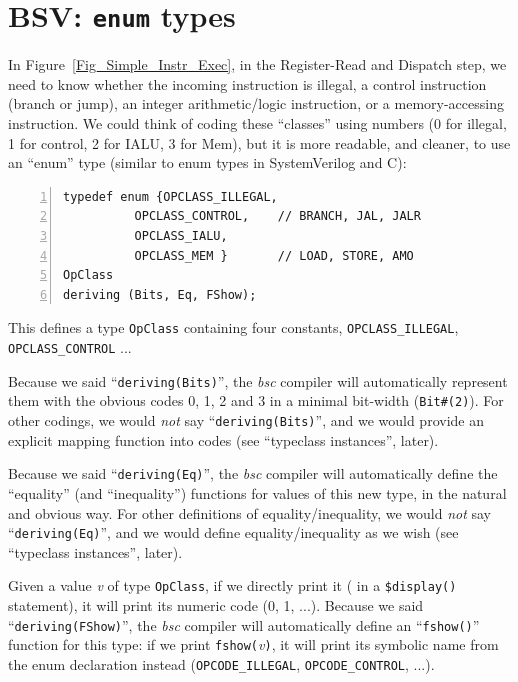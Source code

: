 
\section{BSV: {\tt enum} types}

\label{BSV_enum_types}


In Figure~\ref{Fig_Simple_Instr_Exec}, in the Register-Read
and Dispatch step, we need to know whether the incoming instruction is
illegal, a control instruction (branch or jump), an integer
arithmetic/logic instruction, or a memory-accessing instruction.  We
could think of coding these ``classes'' using numbers (0 for illegal,
1 for control, 2 for IALU, 3 for Mem), but it is more readable, and
cleaner, to use an ``enum'' type (similar to enum types in
SystemVerilog and C):

\begin{Verbatim}[frame=single, numbers=left]
typedef enum {OPCLASS_ILLEGAL,
	      OPCLASS_CONTROL,    // BRANCH, JAL, JALR
	      OPCLASS_IALU,
	      OPCLASS_MEM }       // LOAD, STORE, AMO
OpClass
deriving (Bits, Eq, FShow);
\end{Verbatim}

This defines a type \verb|OpClass| containing four constants,
\verb|OPCLASS_ILLEGAL|, \verb|OPCLASS_CONTROL| ...


Because we said ``\verb|deriving(Bits)|'', the \emph{bsc} compiler
will automatically represent them with the obvious codes 0, 1, 2 and 3
in a minimal bit-width (\verb|Bit#(2)|).  For other codings, we would
\emph{not} say ``\verb|deriving(Bits)|'', and we would provide an
explicit mapping function into codes (see ``typeclass instances'',
later).


Because we said ``\verb|deriving(Eq)|'', the \emph{bsc} compiler will
automatically define the ``equality'' (and ``inequality'') functions
for values of this new type, in the natural and obvious way.  For
other definitions of equality/inequality, we would \emph{not} say
``\verb|deriving(Eq)|'', and we would define equality/inequality as we
wish (see ``typeclass instances'', later).


Given a value \emph{v} of type \verb|OpClass|, if we directly print it
({\eg} in a \verb|$display()| statement), it will print its numeric
code (0, 1, ...).  Because we said ``\verb|deriving(FShow)|'', the
\emph{bsc} compiler will automatically define an ``\verb|fshow()|''
function for this type: if we print \verb|fshow(|\emph{v}\verb|)|, it
will print its symbolic name from the enum declaration instead
(\verb|OPCODE_ILLEGAL|, \verb|OPCODE_CONTROL|, ...).

